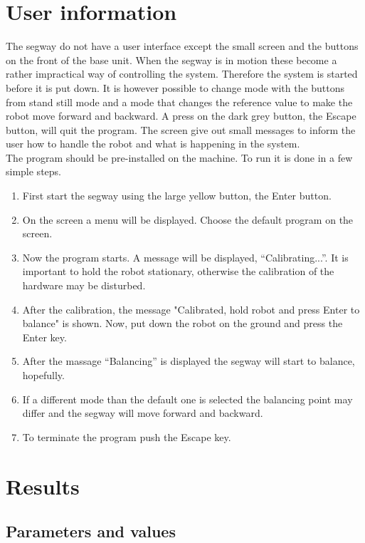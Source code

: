 \documentclass[a4paper]{article}
\begin{document}
\section{User information}

The segway do not have a user interface except the small screen and the buttons on the front of the base unit. When the segway is in motion these become a rather impractical way of controlling the system. Therefore the system is started before it is put down. It is however possible to change mode with the buttons from stand still mode and a mode that changes the reference value to make the robot move forward and backward. A press on the dark grey button, the Escape button, will quit the program. The screen give out small messages to inform the user how to handle the robot and what is happening in the system.\\

The program should be pre-installed on the machine. To run it is done in a few simple steps.

\begin{enumerate}
\item First start the segway using the large yellow button, the Enter button.
\item On the screen a menu will be displayed. Choose the default program on the screen.
\item Now the program starts. A message will be displayed, “Calibrating...”. It is important to hold the robot stationary, otherwise the calibration of the hardware may be disturbed.
\item After the calibration, the message "Calibrated, hold robot and press Enter to balance" is shown. Now, put down the robot on the ground and press the Enter key.
\item After the massage “Balancing” is displayed the segway will start to balance, hopefully.
\item If a different mode than the default one is selected the balancing point may differ and the segway will move forward and backward.
\item To terminate the program push the Escape key.
\end{enumerate}

\section{Results}
\subsection{Parameters and values}
\end{document}
